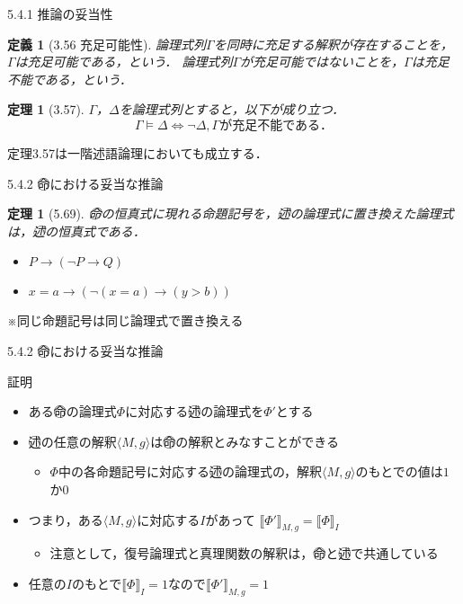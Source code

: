 \documentclass[dvipdfmx,11pt]{beamer}
\newcommand{\predl}{\textcircled{\scriptsize 述}}
\newcommand{\propl}{\textcircled{\scriptsize 命}}
\newtheorem{defi}[theorem]{定義}
\newtheorem{theo}[theorem]{定理}
\begin{document}
\begin{frame}{5.4.1 推論の妥当性}
  \begin{defi}[3.56 充足可能性]
    論理式列\(\Gamma\)を同時に充足する解釈が存在することを，\(\Gamma\)は充足可能である，という．
    論理式列\(\Gamma\)が充足可能ではないことを，\(\Gamma\)は充足不能である，という．
  \end{defi}

  \begin{theo}[3.57]
    \(\Gamma\)，\(\Delta\)を論理式列とすると，以下が成り立つ．
    \[
    \Gamma\vDash\Delta \iff \neg\Delta,\Gamma\textit{が充足不能である．}
    \]
  \end{theo}

  定理3.57は一階述語論理においても成立する．
\end{frame}

\begin{frame}{5.4.2 \propl{}における妥当な推論}
  \begin{theo}[5.69]
    \propl{}の恒真式に現れる命題記号を，\predl{}の論理式に置き換えた論理式は，\predl{}の恒真式である．
  \end{theo}

  \begin{example}
    \begin{itemize}
    \item \(P\rightarrow (\neg P\rightarrow Q)\)
    \item \(x=a\rightarrow (\neg (x=a)\rightarrow (y>b))\)
    \end{itemize}
  \end{example}

  ※同じ命題記号は同じ論理式で置き換える
\end{frame}

\begin{frame}{5.4.2 \propl{}における妥当な推論}
  \begin{block}{証明}
  \begin{itemize}
  \item ある\propl{}の論理式\(\Phi\)に対応する\predl{}の論理式を\(\Phi'\)とする
  \item \predl{}の任意の解釈\(\langle M,g \rangle\)は\propl{}の解釈とみなすことができる
    \begin{itemize}
    \item \(\Phi\)中の各命題記号に対応する\predl{}の論理式の，解釈\(\langle M,g \rangle\)のもとでの値は\(1\)か\(0\)
    \end{itemize}
  \item つまり，ある\(\langle M,g \rangle\)に対応する\(I\)があって
    \(\llbracket\Phi'\rrbracket_{M,g}=\llbracket\Phi\rrbracket_{I}\)
    \begin{itemize}
    \item 注意として，復号論理式と真理関数の解釈は，\propl{}と\predl{}で共通している
    \end{itemize}
  \item 任意の\(I\)のもとで\(\llbracket\Phi\rrbracket_{I} = 1\)なので\(\llbracket\Phi'\rrbracket_{M,g} = 1\)
  \end{itemize}
  \end{block}
\end{frame}
\end{document}
